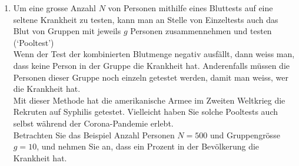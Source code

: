 \begin{ueb}
\begin{enumerate}
\begin{enumerate}
                  \item Anzahl der Runs: Ein Run ist eine Folge von benachbarten gleichen Symbolen, die durch den Anfang, einen Wechsel oder das Ende begrenzt wird. \\
                        Das Ergebnis (Z, Z, K, K, K, Z, K, K, K, K) eines 10-fachen Münzwurfs hat also die vier Runs Z, Z; K, K, K; Z und K, K, K, K.
                        \begin{enumerate}
                            \item Wie viele Runs gibt es in den notierten Beispielen? Wie viele Runs gibt es in der echten Zufallsfolge, bei der eine Münze geworfen wurde?
                            \item Begründen Sie, weshalb die Anzahl Runs gleich der Anzahl Wechsel plus Eins ist.
                            \item Wie wahrscheinlich ist es, dass ein Wechsel an einer vorgegebenen Stelle auftritt?
                            \item Wie gross ist der Erwartungswert für die Anzahl Wechsel, bzw. die Anzahl Runs? Wie viele Runs kann man demnach in 50 Münzwürfen erwarten?
                        \end{enumerate}

                  \item Unterscheidung von konstruierten und echten Beispielen:

                        Bestimmen Sie das 90\%-Vorhersageintervall für die Anzahl Wechsel.
                        Bei wie vielen eurer konstruierten Beispiele liegt die tatsächliche Anzahl Wechsel in diesem Intervall?

              \end{enumerate}


        \item Um eine grosse Anzahl \( N \) von Personen mithilfe eines Bluttests auf eine seltene Krankheit zu testen, kann man an Stelle von Einzeltests auch das Blut von Gruppen mit jeweils \( g \) Personen zusammennehmen und testen (`Pooltest') \\
              Wenn der Test der kombinierten Blutmenge negativ ausfällt, dann weiss man, dass keine Person in der Gruppe die Krankheit hat. Anderenfalls müssen die Personen dieser Gruppe noch einzeln getestet werden, damit man weiss, wer die Krankheit hat. \\
              Mit dieser Methode hat die amerikanische Armee im Zweiten Weltkrieg die Rekruten auf Syphilis getestet. Vielleicht haben Sie solche Pooltests auch selbst während der Corona-Pandemie erlebt. \\
              Betrachten Sie das Beispiel Anzahl Personen \( N = 500 \) und Gruppengrösse \( g = 10 \), und nehmen Sie an, dass ein Prozent in der Bevölkerung die Krankheit hat.


\end{enumerate}
\end{ueb}
